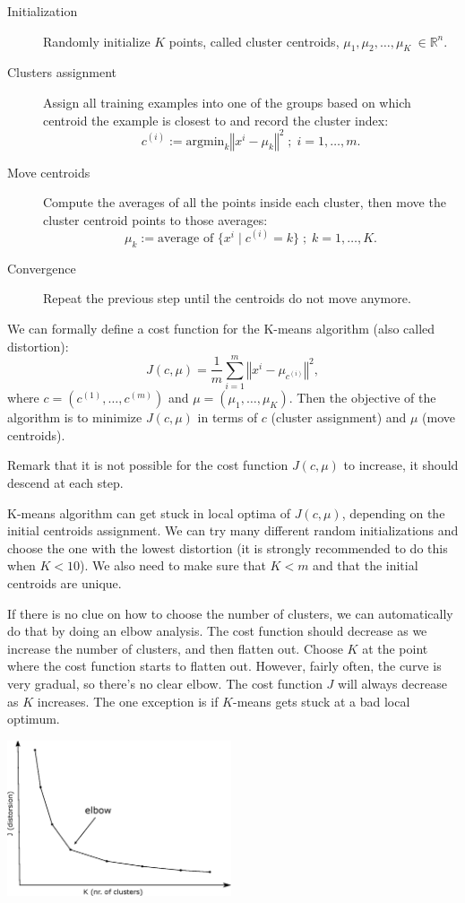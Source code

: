 \documentclass[a4paper,11pt]{report}
\newcommand{\norm}[1]{\left\Vert#1\right\Vert}
\begin{document}
\begin{description}
  \item[Initialization] Randomly initialize $K$ points, called cluster centroids, $\mu_1, \mu_2, \ldots, \mu_K\ \in \mathbb{R}^n$.
  \item[Clusters assignment] Assign all training examples into one of the groups based on which centroid the example is closest to and record the cluster index:
  $$c^{(i)} := \text{argmin}_{k}{\norm{x^i - \mu_k}^2}\; ; \; i=1,\ldots,m. $$
  \item[Move centroids] Compute the averages of all the points inside each cluster, then move the cluster centroid points to those averages:
  $$\mu_k := \text{average of } \{x^i \;|\; c^{(i)} = k\}\; ; \; k=1,\ldots,K.$$
  \item[Convergence] Repeat the previous step until the centroids do not move anymore.
\end{description}

We can formally define a cost function for the K-means algorithm (also called distortion):
$$J(c, \mu) = \dfrac{1}{m} \sum_{i=1}^{m}{\norm{x^i - \mu_{c^{(i)}}}^2},$$ where $c = (c^{(1)}, \ldots, c^{(m)})$ and $\mu = (\mu_1, \ldots, \mu_K)$.
Then the objective of the algorithm is to minimize $J(c, \mu)$ in terms of $c$ (cluster assignment) and $\mu$ (move centroids).

Remark that it is not possible for the cost function $J(c, \mu)$ to increase, it should descend at each step.

K-means algorithm can get stuck in local optima of $J(c, \mu)$, depending on the initial centroids assignment. We can try many different random initializations and choose the one with the lowest distortion (it is strongly recommended to do this when $K<10$). We also need to make sure that $K < m$ and that the initial centroids are unique.

If there is no clue on how to choose the number of clusters, we can automatically do that by doing an elbow analysis.  The cost function should decrease as we increase the number of clusters, and then flatten out. Choose $K$ at the point where the cost function starts to flatten out. However, fairly often, the curve is very gradual, so there's no clear elbow. The cost function $J$ will always decrease as $K$ increases. The one exception is if $K$-means gets stuck at a bad local optimum.

\hspace{1.0in}
\begin{center}
\includegraphics[height = 1.8in]{ml_images/elbow}
\end{center}
\end{document}
